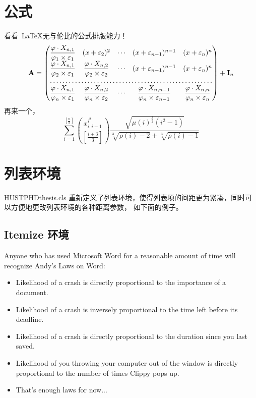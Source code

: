 \section{公式}

看看~\LaTeX 无与伦比的公式排版能力！
\begin{equation}
\mathbf{A} =
\begin{pmatrix}
\dfrac{\varphi \cdot X_{n, 1}} {\varphi_{1} \times \varepsilon_{1}}
& (x + \varepsilon_{2})^{2} & \cdots & (x + \varepsilon_{n - 1})^{n
- 1}
& (x + \varepsilon_{n})^{n}\\
\dfrac{\varphi \cdot X_{n, 1}} {\varphi_{2} \times \varepsilon_{1}}
& \dfrac{\varphi \cdot X_{n, 2}} {\varphi_{2} \times
\varepsilon_{2}} & \cdots & (x + \varepsilon_{n - 1})^{n - 1}
& (x + \varepsilon_{n})^{n}\\
\hdotsfor{5}\\
\dfrac{\varphi \cdot X_{n, 1}} {\varphi_{n} \times \varepsilon_{1}}
& \dfrac{\varphi \cdot X_{n, 2}} {\varphi_{n} \times
\varepsilon_{2}} & \cdots & \dfrac{\varphi \cdot X_{n, n - 1}}
{\varphi_{n} \times \varepsilon_{n - 1}} & \dfrac{\varphi\cdot X_{n,
n}} {\varphi_{n} \times \varepsilon_{n}}
\end{pmatrix}
+ \mathbf{I}_{n}
\end{equation}
再来一个，
\begin{equation}
\sum_{i=1}^{\left[ \frac{n}{2}\right]} \binom{x_{i,i+1}^{i^2}}
{\left[\frac{i+3}{3} \right]} \frac{\sqrt{\mu(i)^{\frac{3}{2}}
(i^2-1)}} {\sqrt[3]{\rho(i)-2}+\sqrt[3]{\rho(i)-1}}
\end{equation}


\section{列表环境}

HUSTPHDthesis.cls
重新定义了列表环境，使得列表项的间距更为紧凑，同时可以方便地更改列表环境的各种距离参数，
如下面的例子。

\subsection{Itemize 环境}

Anyone who has used Microsoft Word for a reasonable amount of time
will recognize Andy's Laws on Word:
\begin{itemize}
\item Likelihood of a crash is directly proportional to the importance of a document.
\item Likelihood of a crash is inversely proportional to the time left before its deadline.
\item Likelihood of a crash is directly proportional to the duration since you last saved.
\item Likelihood of you throwing your computer out of the window is directly proportional
to the number of times Clippy pops up.
\item That's enough laws for now...
\end{itemize}

